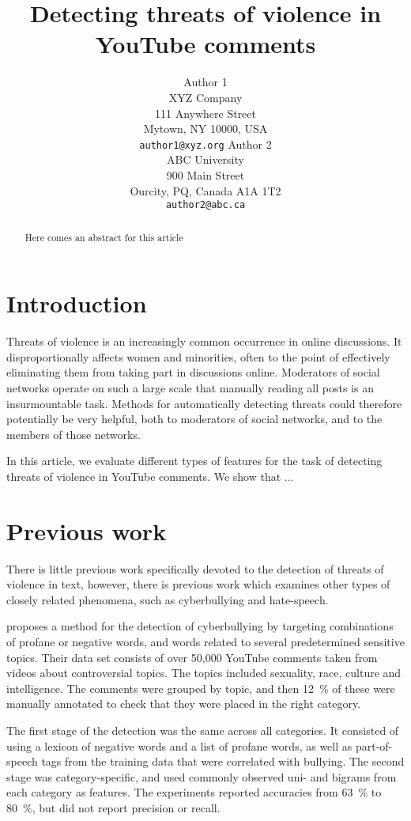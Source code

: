 \documentclass[11pt,letterpaper]{article}
\title{Detecting threats of violence in YouTube comments}
\author{Author 1\\
	    XYZ Company\\
	    111 Anywhere Street\\
	    Mytown, NY 10000, USA\\
	    {\tt author1@xyz.org}
	  \And
	Author 2\\
  	ABC University\\
  	900 Main Street\\
  	Ourcity, PQ, Canada A1A 1T2\\
  {\tt author2@abc.ca}}
\date{}
\begin{document}
\maketitle

\begin{abstract}
Here comes an abstract for this article
\end{abstract}

\section{Introduction}
\label{sec:intro}
Threats of violence is an increasingly common occurrence in online
discussions. It disproportionally affects women and minorities, often
to the point of effectively eliminating them from taking part in
discussions online. Moderators of social networks operate on such a
large scale that manually reading all posts is an insurmountable
task. Methods for automatically detecting threats could therefore
potentially be very helpful, both to moderators of social networks,
and to the members of those networks.

In this article, we evaluate different types of features for the task
of detecting threats of violence in YouTube comments. We show that ...

\section{Previous work}
\label{sec:prev}
There is little previous work specifically devoted to the detection of
threats of violence in text, however, there is previous work which
examines other types of closely related phenomena, such as
cyberbullying and hate-speech.

 proposes a method for the detection of
cyberbullying by targeting combinations of profane or negative words,
and words related to several predetermined sensitive topics. Their
data set consists of over 50,000 YouTube comments taken from videos
about controversial topics. The topics included sexuality, race,
culture and intelligence. The comments were grouped by topic, and then
12~\% of these were manually annotated to check that they were placed
in the right category.

The first stage of the detection was the same across all
categories. It consisted of using a lexicon of negative words and a
list of profane words, as well as part-of-speech tags from the
training data that were correlated with bullying. The second stage was
category-specific, and used commonly observed uni- and bigrams from
each category as features. The experiments reported accuracies from
63~\% to 80~\%, but did not report precision or recall.
\end{document}
